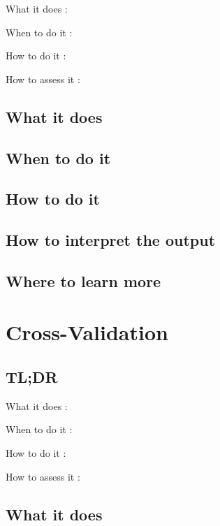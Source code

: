 \documentclass[
]{book}
\begin{document}
What it does
:

When to do it
:

How to do it
:

How to assess it
:

\hypertarget{what-it-does-8}{%
\section{What it does}\label{what-it-does-8}}

\hypertarget{when-to-do-it-8}{%
\section{When to do it}\label{when-to-do-it-8}}

\hypertarget{how-to-do-it-8}{%
\section{How to do it}\label{how-to-do-it-8}}

\hypertarget{how-to-interpret-the-output-8}{%
\section{How to interpret the output}\label{how-to-interpret-the-output-8}}

\hypertarget{where-to-learn-more-8}{%
\section{Where to learn more}\label{where-to-learn-more-8}}

\hypertarget{cross-validation}{%
\chapter{Cross-Validation}\label{cross-validation}}

\hypertarget{tldr-9}{%
\section{TL;DR}\label{tldr-9}}

What it does
:

When to do it
:

How to do it
:

How to assess it
:

\hypertarget{what-it-does-9}{%
\section{What it does}\label{what-it-does-9}}
\end{document}
